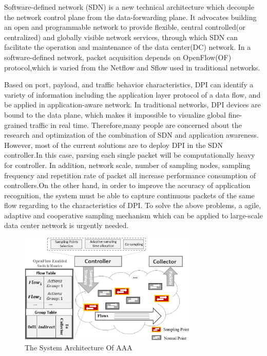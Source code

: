 \documentclass[conference,compsoc]{IEEEtran}
\begin{document}
Software-defined network (SDN) is a new technical architecture which decouple the network control plane from the data-forwarding plane. It advocates building an open and programmable network to provide flexible, central controlled(or centralized) and globally visible network services, through which SDN can facilitate the operation and maintenance of the data center(DC) network. In a software-defined network, packet acquisition depends on OpenFlow(OF) protocol,which is varied from the Netflow and Sflow used in traditional networks.

Based on port, payload, and traffic behavior characteristics, DPI can identify a variety of  information including the application layer protocol of a data flow, and be applied in application-aware network. In traditional networks, DPI devices are bound to the data plane, which makes it impossible to visualize global fine-grained traffic in real time. Therefore,many people are concerned about the research and optimization of the combination of SDN and application awareness. However, most of the current solutions are to deploy DPI in the SDN controller.In this case, parsing each single packet will be  computationally heavy for controller. In addition, network scale, number of sampling nodes, sampling frequency and repetition rate of packet all increase performance consumption of controllers.On the other hand, in order to improve the accuracy of application recognition, the system must be able to capture continuous  packets of the same flow regarding to the characteristics of DPI.
To solve the above problems, a agile, adaptive and cooperative sampling mechanism which can be applied to large-scale data center network is urgently needed. 


\begin{figure}[!hhhhhhhhhht]
\centering
\includegraphics[width=8.5cm]{images/png_architecture.png}
\caption{The System Architecture Of AAA}
\label{Architecture}
\end{figure}
\end{document}
